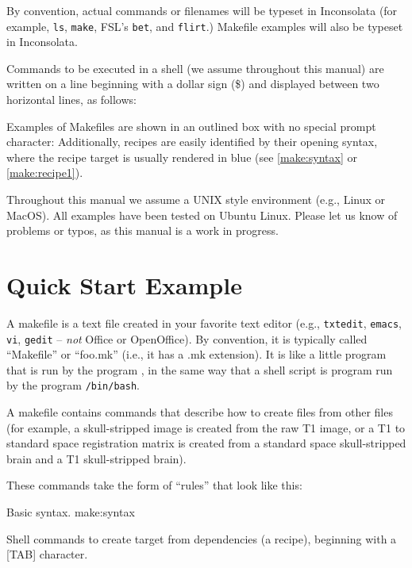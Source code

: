 By convention, actual commands or filenames will be typeset in Inconsolata (for example, \texttt{ls}, \texttt{make}, FSL's \texttt{bet}, and \texttt{flirt}.) Makefile examples will also be typeset in Inconsolata.
	
Commands to be executed in a shell (we assume \bashn{} throughout this manual) are written on a line beginning with a dollar sign (\$) and displayed between two horizontal lines, as follows:	
	
Examples of Makefiles are shown in an outlined box with no special prompt character:
Additionally, recipes are easily identified by their opening syntax, where the recipe target is usually rendered in blue (see \autoref{make:syntax} or \autoref{make:recipe1}).	
	
Throughout this manual we assume a UNIX style environment (e.g., Linux or MacOS). All examples have been tested on Ubuntu Linux. Please let us know of problems or typos, as this manual is a work in progress.
	
\section{Quick Start Example}
	
A makefile is a text file created in your favorite text editor (e.g., \texttt{txtedit}, \texttt{emacs}, \texttt{vi}, \texttt{gedit} -- \emph{not} Office or OpenOffice). By convention, it is typically called ``Makefile'' or ``foo.mk'' (i.e., it has a .mk extension). It is like a little program that is run by the program \maken{}, in the same way that a shell script is program run by the program \texttt{/bin/bash}.
	
A makefile contains commands that describe how to create files from other files (for example, a skull-stripped image is created from the raw T1 image, or a T1 to standard space registration matrix is created from a standard space skull-stripped brain and a T1 skull-stripped brain).
	
These commands take the form of ``rules'' that look like this:
	
\begin{make}{Basic \maken{} syntax. }{make:syntax}
	 \\
	\tab \begin{minipage}[t]{\linewidth-4em} {\color{gray} Shell commands to create target from dependencies (a recipe), beginning with a [TAB] character.} 	\end{minipage}
\end{make}
	
